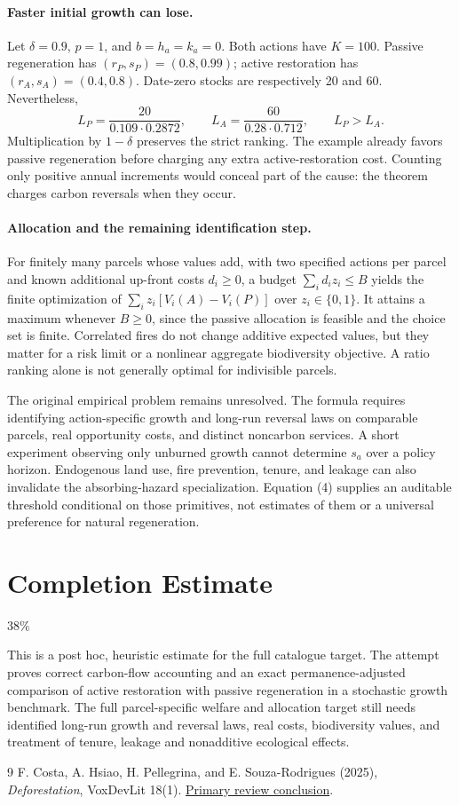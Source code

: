 \documentclass[11pt]{article}
\theoremstyle{definition}
\begin{document}
\paragraph{Faster initial growth can lose.}
Let $\delta=0.9$, $p=1$, and $b=h_a=k_a=0$. Both actions have $K=100$. Passive regeneration has $(r_P,s_P)=(0.8,0.99)$; active restoration has $(r_A,s_A)=(0.4,0.8)$. Date-zero stocks are respectively 20 and 60. Nevertheless,
\[
 L_P=\frac{20}{0.109\cdot0.2872},\qquad
 L_A=\frac{60}{0.28\cdot0.712},\qquad L_P>L_A.
\]
Multiplication by $1-\delta$ preserves the strict ranking. The example already favors passive regeneration before charging any extra active-restoration cost. Counting only positive annual increments would conceal part of the cause: the theorem charges carbon reversals when they occur.

\paragraph{Allocation and the remaining identification step.}
For finitely many parcels whose values add, with two specified actions per parcel and known additional up-front costs $d_i\geq0$, a budget $\sum_i d_i z_i\leq B$ yields the finite optimization of $\sum_i z_i[V_i(A)-V_i(P)]$ over $z_i\in\{0,1\}$. It attains a maximum whenever $B\geq0$, since the passive allocation is feasible and the choice set is finite. Correlated fires do not change additive expected values, but they matter for a risk limit or a nonlinear aggregate biodiversity objective. A ratio ranking alone is not generally optimal for indivisible parcels.

The original empirical problem remains unresolved. The formula requires identifying action-specific growth and long-run reversal laws on comparable parcels, real opportunity costs, and distinct noncarbon services. A short experiment observing only unburned growth cannot determine $s_a$ over a policy horizon. Endogenous land use, fire prevention, tenure, and leakage can also invalidate the absorbing-hazard specialization. Equation (4) supplies an auditable threshold conditional on those primitives, not estimates of them or a universal preference for natural regeneration.

\section{Completion Estimate}
38\%

This is a post hoc, heuristic estimate for the full catalogue target.
The attempt proves correct carbon-flow accounting and an exact permanence-adjusted comparison of active restoration with passive regeneration in a stochastic growth benchmark. The full parcel-specific welfare and allocation target still needs identified long-run growth and reversal laws, real costs, biodiversity values, and treatment of tenure, leakage and nonadditive ecological effects.

\begin{thebibliography}{9}
 F. Costa, A. Hsiao, H. Pellegrina, and E. Souza-Rodrigues (2025), \emph{Deforestation}, VoxDevLit 18(1). \href{https://voxdev.org/voxdevlit/deforestation/conclusion-and-evidence-gaps}{Primary review conclusion}.
\end{thebibliography}
\end{document}
